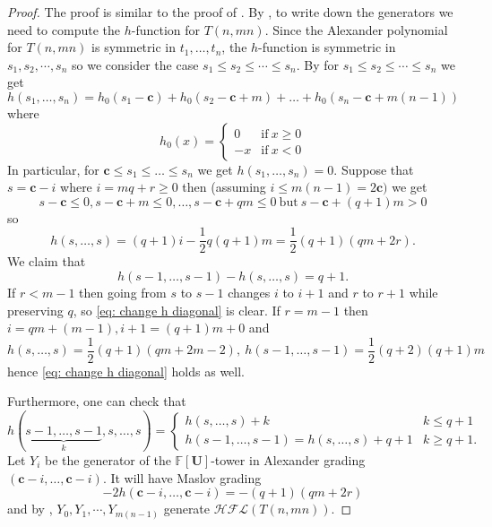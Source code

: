 \documentclass{amsart}
\newtheorem{theorem}{Theorem}[section]
\newcommand{\F}{\mathbb{F}}
\newcommand{\cHFL}{\mathcal{H\!F\! L}}
\newcommand{\w}{\mathbf{w}}
\def\gr{\textup{gr}}
\def\w{{\bf{w}}}
\newcommand{\UU}{\mathbf{U}}
\newcommand{\cc}{\mathbf{c}}
\begin{document}

\begin{proof}
The proof is similar to the proof of \cite[Theorem 7.3]{BLZ}. By  \cite[Lemma 7.1]{BLZ}, to write down the generators we need to compute the $h$-function for $T(n,mn)$.  Since the Alexander polynomial for $T(n,mn)$ is symmetric in $t_1,\ldots,t_n$, the $h$-function is symmetric in $s_1,s_2,\cdots,s_n$ so we consider the case $s_1\le s_2\le\cdots \le s_n$. By \cite[Theorem 4.3]{GH} for $s_1\le s_2\le\cdots \le s_n$ we get
\begin{equation}
\label{eq: h function cable}
h(s_1,\ldots,s_n)=h_0(s_1-\cc)+h_0(s_2-\cc+m)+\ldots+h_0(s_n-\cc+m(n-1))
\end{equation}
where  
$$
h_0(x)=\begin{cases}
0 & \mathrm{if}\ x\ge 0\\
-x & \mathrm{if}\ x<0
\end{cases}
$$
In particular, for $\cc\le s_1\le \ldots\le s_n$ we get $h(s_1,\ldots,s_n)=0$. Suppose that $s=\cc-i$ where $i=mq+r\ge 0$ then (assuming $i\le m(n-1)=2\cc)$ we get
$$
s-\cc\le 0, s-\cc+m\le 0,\ldots,s-\cc+qm\le 0\ \mathrm{but}\ s-\cc+(q+1)m>0
$$
so 
$$
h(s,\ldots,s)=(q+1)i-\frac{1}{2}q(q+1)m=\frac{1}{2}(q+1)(qm+2r).
$$
We claim that 
\begin{equation}
\label{eq: change h diagonal}
h(s-1,\ldots,s-1)-h(s,\ldots,s)=q+1.
\end{equation}
 If $r<m-1$ then going from $s$ to $s-1$ changes $i$ to $i+1$ and $r$ to $r+1$ while preserving $q$, so \eqref{eq: change h diagonal} is clear. If $r=m-1$ then $i=qm+(m-1),i+1=(q+1)m+0$ and
$$
h(s,\ldots,s)=\frac{1}{2}(q+1)(qm+2m-2),\ h(s-1,\ldots,s-1)=\frac{1}{2}(q+2)(q+1)m
$$
hence \eqref{eq: change h diagonal} holds as well.

Furthermore, one can check that
$$
h(\underbrace{s-1,\ldots,s-1}_{k},s,\ldots,s)=
\begin{cases}
h(s,\ldots,s)+k & k\le q+1\\
h(s-1,\ldots,s-1)=h(s,\ldots,s)+q+1 & k\ge q+1.
\end{cases}
$$
Let $Y_i$ be the generator of the $\F[\UU]$-tower in Alexander grading $(\cc-i,\ldots,\cc-i)$. It will have Maslov grading  
\[-2h(\cc-i,\ldots,\cc-i)=-(q+1)(qm+2r)\]
and by \cite[Lemma 7.1]{BLZ}, $Y_0,Y_1,\cdots,Y_{m(n-1)}$ generate $\cHFL(T(n,mn))$.


\end{proof}
\end{document}
